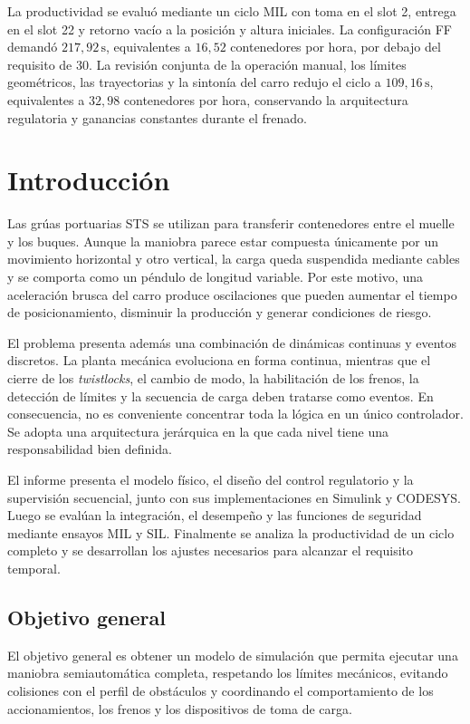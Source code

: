 \documentclass[a4paper,10pt,onecolumn,journal]{ieeeconf}
\numberwithin{equation}{section}
\newcommand{\un}[1]{\,\mathrm{#1}}
\begin{document}
La productividad se evaluó mediante un ciclo MIL con toma en el slot 2, entrega en el slot 22 y retorno vacío a la posición y altura iniciales. La configuración FF demandó $217{,}92\un{s}$, equivalentes a $16{,}52$ contenedores por hora, por debajo del requisito de 30. La revisión conjunta de la operación manual, los límites geométricos, las trayectorias y la sintonía del carro redujo el ciclo a $109{,}16\un{s}$, equivalentes a $32{,}98$ contenedores por hora, conservando la arquitectura regulatoria y ganancias constantes durante el frenado.
\par

\section{Introducción}
Las grúas portuarias STS se utilizan para transferir contenedores entre el muelle y los buques. Aunque la maniobra parece estar compuesta únicamente por un movimiento horizontal y otro vertical, la carga queda suspendida mediante cables y se comporta como un péndulo de longitud variable. Por este motivo, una aceleración brusca del carro produce oscilaciones que pueden aumentar el tiempo de posicionamiento, disminuir la producción y generar condiciones de riesgo.
	
	El problema presenta además una combinación de dinámicas continuas y eventos discretos. La planta mecánica evoluciona en forma continua, mientras que el cierre de los \textit{twistlocks}, el cambio de modo, la habilitación de los frenos, la detección de límites y la secuencia de carga deben tratarse como eventos. En consecuencia, no es conveniente concentrar toda la lógica en un único controlador. Se adopta una arquitectura jerárquica en la que cada nivel tiene una responsabilidad bien definida.
	
	El informe presenta el modelo físico, el diseño del control regulatorio y la supervisión secuencial, junto con sus implementaciones en Simulink y CODESYS. Luego se evalúan la integración, el desempeño y las funciones de seguridad mediante ensayos MIL y SIL. Finalmente se analiza la productividad de un ciclo completo y se desarrollan los ajustes necesarios para alcanzar el requisito temporal.
	
	
	\subsection{Objetivo general}
	El objetivo general es obtener un modelo de simulación que permita ejecutar una maniobra semiautomática completa, respetando los límites mecánicos, evitando colisiones con el perfil de obstáculos y coordinando el comportamiento de los accionamientos, los frenos y los dispositivos de toma de carga.
	
\end{document}
